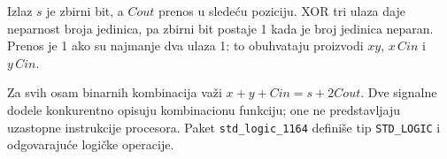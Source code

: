 Izlaz \(s\) je zbirni bit, a \(Cout\) prenos u sledeću poziciju. XOR tri ulaza daje neparnost broja jedinica, pa zbirni bit postaje 1 kada je broj jedinica neparan. Prenos je 1 ako su najmanje dva ulaza 1: to obuhvataju proizvodi \(xy\), \(x\,Cin\) i \(y\,Cin\).

Za svih osam binarnih kombinacija važi \(x+y+Cin=s+2Cout\). Dve signalne dodele konkurentno opisuju kombinacionu funkciju; one ne predstavljaju uzastopne instrukcije procesora. Paket \texttt{std\_logic\_1164} definiše tip \texttt{STD\_LOGIC} i odgovarajuće logičke operacije.
